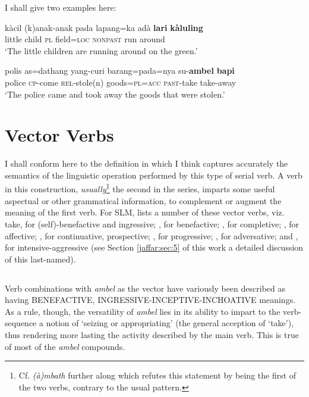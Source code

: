 I shall give two examples here:


\ea\label{jaffar:ex:3}
\gll kàcil (k)anak-anak pada lapang=ka adà \textbf{lari} \textbf{kàluling}\\
 little child     \textsc{pl} field=\textsc{loc}  \textsc{nonpast} run around\\
 `The little children are running around on the green.'
\z


\ea\label{jaffar:ex:4}
\gll polis as=dathang yang-curi barang=pada=nya su-\textbf{ambel} \textbf{bapi}\\
 police \textsc{cp}-come \textsc{rel}-stole(n) goods=\textsc{pl}=\textsc{acc}  \textsc{past}-take take-away\\
 `The police came and took away the goods that were stolen.'
\z


\section{Vector Verbs}%

I shall conform here to the definition in \citet{Nordhoff2009} which I think captures accurately the semantics of the linguistic operation performed by this type of serial verb. A verb in this construction, \textit{usually}\footnote{Cf.
 \textit{(à)mbath} further along which refutes this statement by being the first of the two verbs, contrary to the usual pattern.
} 
the second in the series, imparts some useful aspectual or other grammatical information, to complement or augment the meaning of the first verb. For SLM,
\citet[174]{Nordhoff2009} lists a number of these vector verbs, viz. 
 {take}, for (self)-benefactive and ingressive; 
, for benefactive; 
, for completive; 
, for affective; 
, for continuative, prospective; 
, for progressive; 
, for adversative; 
and , for intensive-aggressive (see Section \ref{jaffar:sec:5} of this work a detailed discussion of this last-named).

\subsection{}
Verb combinations with \textit{ambel} as the vector have variously been described as having BENEFACTIVE, INGRESSIVE-INCEPTIVE-INCHOATIVE meanings. As a rule, though, the versatility of \textit{ambel} lies in its ability to impart to the verb-sequence a notion of `seizing or appropriating' (the general acception of `take'), thus rendering more lasting the activity described by the main verb. This is true of most of the \textit{ambel} compounds.

